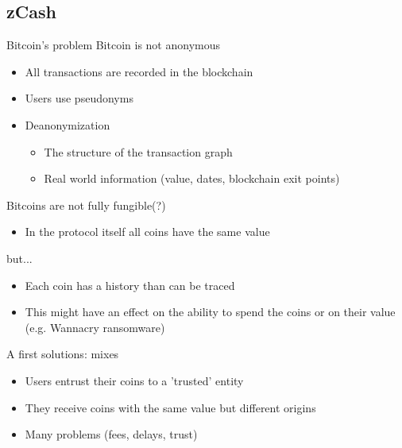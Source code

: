 \documentclass[handout]{beamer}
\begin{document}
\subsection{zCash}
\begin{frame}[allowframebreaks]{Bitcoin's problem}
    Bitcoin is not anonymous  
    \begin{itemize}
        \item All transactions are recorded in the blockchain  
        \item Users use pseudonyms  
        \item Deanonymization  
        \begin{itemize}
            \item The structure of the transaction graph  
            \item Real world information (value, dates, blockchain exit points)  
        \end{itemize} 
    \end{itemize}
    Bitcoins are not fully fungible(?)  
    \begin{itemize}
        \item In the protocol itself all coins have the same value
    \end{itemize}
    
    but...
    \framebreak 
   
    \begin{itemize}
        \item Each coin has a history than can be traced  
        \item This might have an effect on the ability to spend the coins or on their value (e.g. Wannacry ransomware)  
    \end{itemize}

    A first solutions: mixes  
    \begin{itemize}
        \item Users entrust their coins to a 'trusted' entity  
        \item They receive coins with the same value but different origins  
        \item Many problems (fees, delays, trust) 
    \end{itemize}
\end{frame}
\end{document}
